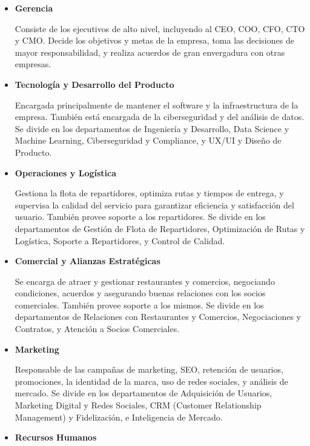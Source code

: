 \begin{itemize}
    \item \textbf{Gerencia} \nopagebreak
    
    Consiste de los ejecutivos de alto nivel, incluyendo al CEO, COO, CFO, CTO y CMO. Decide los objetivos y metas de la empresa, toma las decisiones de mayor responsabilidad, y realiza acuerdos de gran envergadura con otras empresas.

    \item \textbf{Tecnología y Desarrollo del Producto} \nopagebreak
    
    Encargada principalmente de mantener el software y la infraestructura de la empresa. También está encargada de la ciberseguridad y del análisis de datos. Se divide en los departamentos de Ingeniería y Desarrollo, Data Science y Machine Learning, Ciberseguridad y Compliance, y UX/UI y Diseño de Producto.

    \item \textbf{Operaciones y Logística} \nopagebreak
    
    Gestiona la flota de repartidores, optimiza rutas y tiempos de entrega, y supervisa la calidad del servicio para garantizar eficiencia y satisfacción del usuario. También provee soporte a los repartidores. Se divide en los departamentos de Gestión de Flota de Repartidores, Optimización de Rutas y Logística, Soporte a Repartidores, y Control de Calidad.

    \item \textbf{Comercial y Alianzas Estratégicas} \nopagebreak
    
    Se encarga de atraer y gestionar restaurantes y comercios, negociando condiciones, acuerdos y asegurando buenas relaciones con los socios comerciales. También provee soporte a los mismos. Se divide en los departamentos de Relaciones con Restaurantes y Comercios, Negociaciones y Contratos, y Atención a Socios Comerciales.

    \item \textbf{Marketing} \nopagebreak
    
    Responsable de las campañas de marketing, SEO, retención de usuarios, promociones, la identidad de la marca, uso de redes sociales, y análisis de mercado. Se divide en los departamentos de Adquisición de Usuarios, Marketing Digital y Redes Sociales, CRM (Customer Relationship Management) y Fidelización, e Inteligencia de Mercado.

    \item \textbf{Recursos Humanos} \nopagebreak
    

\end{itemize}
